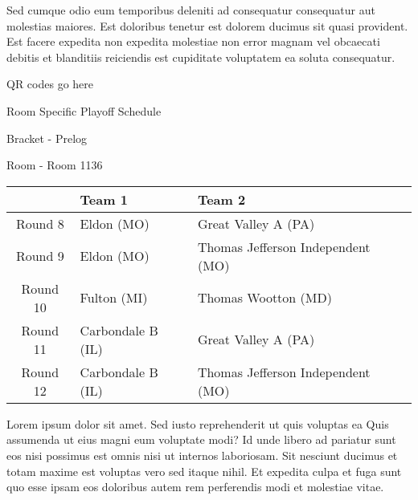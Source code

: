 \documentclass{article}%
\begin{document}
\newline%
Sed cumque odio eum temporibus deleniti ad consequatur consequatur aut molestias maiores. Est doloribus tenetur est dolorem ducimus sit quasi provident. Est facere expedita non expedita molestiae non error magnam vel obcaecati debitis et blanditiis reiciendis est cupiditate voluptatem ea soluta consequatur.%
\vspace*{140pt}%
\begin{center}%
\begin{Huge}%
QR codes go here%
\end{Huge}%
\end{center}%
\newpage%
\begin{center}%
\begin{Huge}%
Room Specific Playoff Schedule%
\end{Huge}%
\vspace*{8pt}%
\linebreak%
\begin{Large}%
Bracket {-} Prelog%
\end{Large}%
\vspace*{8pt}%
\linebreak%
\vspace*{8pt}%
\begin{Large}%
Room {-} Room 1136%
\end{Large}%
\end{center}%
%
\begin{tabularx}{\textwidth}{|c|Y|Y|}%
\hline%
&Team 1&Team 2\\%
\hline%
Round 8&Eldon (MO)&Great Valley A (PA)\\%
Round 9&Eldon (MO)&Thomas Jefferson Independent (MO)\\%
Round 10&Fulton (MI)&Thomas Wootton (MD)\\%
Round 11&Carbondale B (IL)&Great Valley A (PA)\\%
Round 12&Carbondale B (IL)&Thomas Jefferson Independent (MO)\\%
\hline%
\end{tabularx}%
\vspace*{8pt}%
\newline%
Lorem ipsum dolor sit amet. Sed iusto reprehenderit ut quis voluptas ea Quis assumenda ut eius magni eum voluptate modi? Id unde libero ad pariatur sunt eos nisi possimus est omnis nisi ut internos laboriosam. Sit nesciunt ducimus et totam maxime est voluptas vero sed itaque nihil. Et expedita culpa et fuga sunt quo esse ipsam eos doloribus autem rem perferendis modi et molestiae vitae.\newline%
\end{document}
